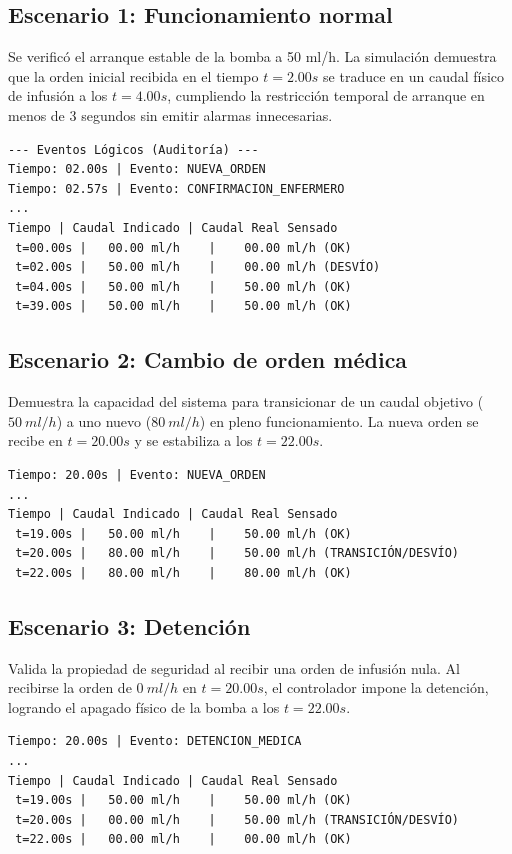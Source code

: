 \subsection{Escenario 1: Funcionamiento normal}
Se verificó el arranque estable de la bomba a 50 ml/h. La simulación demuestra que la orden inicial recibida en el tiempo $t=2.00s$ se traduce en un caudal físico de infusión a los $t=4.00s$, cumpliendo la restricción temporal de arranque en menos de 3 segundos sin emitir alarmas innecesarias.
\begin{verbatim}
--- Eventos Lógicos (Auditoría) ---
Tiempo: 02.00s | Evento: NUEVA_ORDEN
Tiempo: 02.57s | Evento: CONFIRMACION_ENFERMERO
...
Tiempo | Caudal Indicado | Caudal Real Sensado
 t=00.00s |   00.00 ml/h    |    00.00 ml/h (OK)
 t=02.00s |   50.00 ml/h    |    00.00 ml/h (DESVÍO)
 t=04.00s |   50.00 ml/h    |    50.00 ml/h (OK)
 t=39.00s |   50.00 ml/h    |    50.00 ml/h (OK)
\end{verbatim}

\subsection{Escenario 2: Cambio de orden médica}
Demuestra la capacidad del sistema para transicionar de un caudal objetivo ($50~ml/h$) a uno nuevo ($80~ml/h$) en pleno funcionamiento. La nueva orden se recibe en $t=20.00s$ y se estabiliza a los $t=22.00s$.
\begin{verbatim}
Tiempo: 20.00s | Evento: NUEVA_ORDEN
...
Tiempo | Caudal Indicado | Caudal Real Sensado
 t=19.00s |   50.00 ml/h    |    50.00 ml/h (OK)
 t=20.00s |   80.00 ml/h    |    50.00 ml/h (TRANSICIÓN/DESVÍO)
 t=22.00s |   80.00 ml/h    |    80.00 ml/h (OK)
\end{verbatim}

\subsection{Escenario 3: Detención}
Valida la propiedad de seguridad al recibir una orden de infusión nula. Al recibirse la orden de $0~ml/h$ en $t=20.00s$, el controlador impone la detención, logrando el apagado físico de la bomba a los $t=22.00s$.
\begin{verbatim}
Tiempo: 20.00s | Evento: DETENCION_MEDICA
...
Tiempo | Caudal Indicado | Caudal Real Sensado
 t=19.00s |   50.00 ml/h    |    50.00 ml/h (OK)
 t=20.00s |   00.00 ml/h    |    50.00 ml/h (TRANSICIÓN/DESVÍO)
 t=22.00s |   00.00 ml/h    |    00.00 ml/h (OK)
\end{verbatim}

